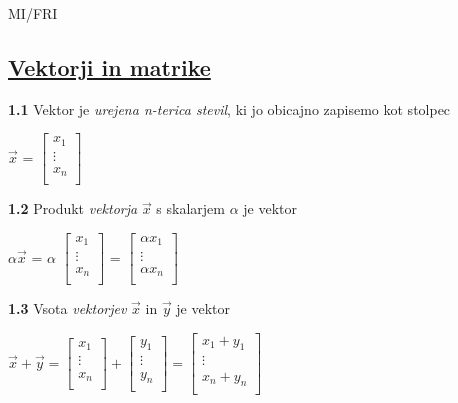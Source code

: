 \documentclass{article}
\begin{document}
\begin{center}
    {\small MI/FRI \par}
\end{center}

\begin{multicols}{2}

\section{\underline{Vektorji in matrike}}

\textbf{1.1} Vektor je \textit{urejena n-terica stevil}, ki jo obicajno
zapisemo kot stolpec\smallskip
\begin{center}
    $\vec{x}$ =
    $\begin{bmatrix}
        x_{1}\\
        \vdots \\
        x_{n}\\
    \end{bmatrix}$
\end{center}

\textbf{1.2} Produkt \textit{vektorja} $\vec{x}$ s skalarjem $\alpha$ je vektor
\begin{center}
    $\alpha \vec{x}$ =
    $\alpha$
    $\begin{bmatrix}
        x_{1}\\
        \vdots \\
        x_{n}\\
    \end{bmatrix}$ =
    $\begin{bmatrix}
        \alpha x_{1}\\
        \vdots \\
        \alpha x_{n}\\
    \end{bmatrix}$
\end{center}

\textbf{1.3} Vsota \textit{vektorjev} $\vec{x}$ in $\vec{y}$ je vektor
\begin{center}
    $\vec{x} + \vec{y} = 
    \begin{bmatrix}
        x_{1}\\
        \vdots \\
        x_{n}\\
    \end{bmatrix} +
    \begin{bmatrix}
        y_{1}\\
        \vdots \\
        y_{n}\\
    \end{bmatrix} =
    \begin{bmatrix}
        x_{1}  +  y_{1}\\
        \vdots\\
        x_{n} + y_{n}\\
    \end{bmatrix} 
    $
\end{center}


\end{multicols}
\end{document}
